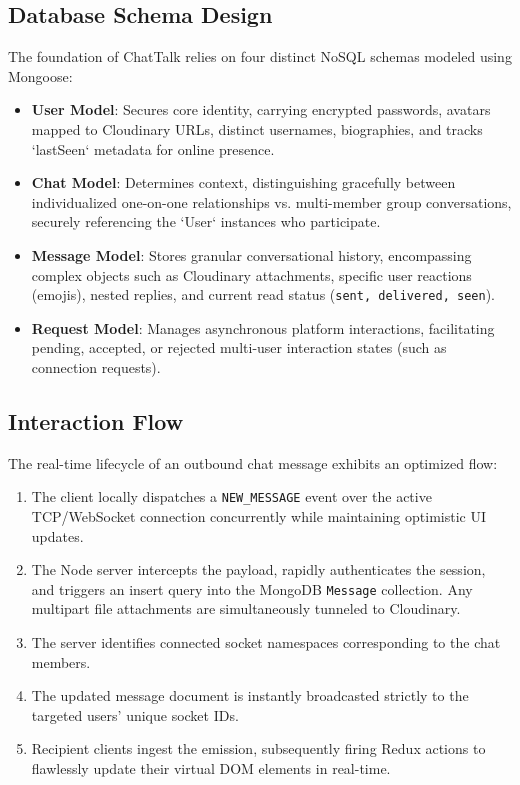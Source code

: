 \documentclass[12pt,a4paper]{article}
\begin{document}
\subsection{Database Schema Design}
The foundation of ChatTalk relies on four distinct NoSQL schemas modeled using Mongoose:
\begin{itemize}
    \item \textbf{User Model}: Secures core identity, carrying encrypted passwords, avatars mapped to Cloudinary URLs, distinct usernames, biographies, and tracks `lastSeen` metadata for online presence.
    \item \textbf{Chat Model}: Determines context, distinguishing gracefully between individualized one-on-one relationships vs. multi-member group conversations, securely referencing the `User` instances who participate.
    \item \textbf{Message Model}: Stores granular conversational history, encompassing complex objects such as Cloudinary attachments, specific user reactions (emojis), nested replies, and current read status (\texttt{sent, delivered, seen}).
    \item \textbf{Request Model}: Manages asynchronous platform interactions, facilitating pending, accepted, or rejected multi-user interaction states (such as connection requests).
\end{itemize}

\subsection{Interaction Flow}
The real-time lifecycle of an outbound chat message exhibits an optimized flow:
\begin{enumerate}
    \item The client locally dispatches a \texttt{NEW\_MESSAGE} event over the active TCP/WebSocket connection concurrently while maintaining optimistic UI updates.
    \item The Node server intercepts the payload, rapidly authenticates the session, and triggers an insert query into the MongoDB \texttt{Message} collection. Any multipart file attachments are simultaneously tunneled to Cloudinary.
    \item The server identifies connected socket namespaces corresponding to the chat members.
    \item The updated message document is instantly broadcasted strictly to the targeted users' unique socket IDs.
    \item Recipient clients ingest the emission, subsequently firing Redux actions to flawlessly update their virtual DOM elements in real-time.
\end{enumerate}
\end{document}
